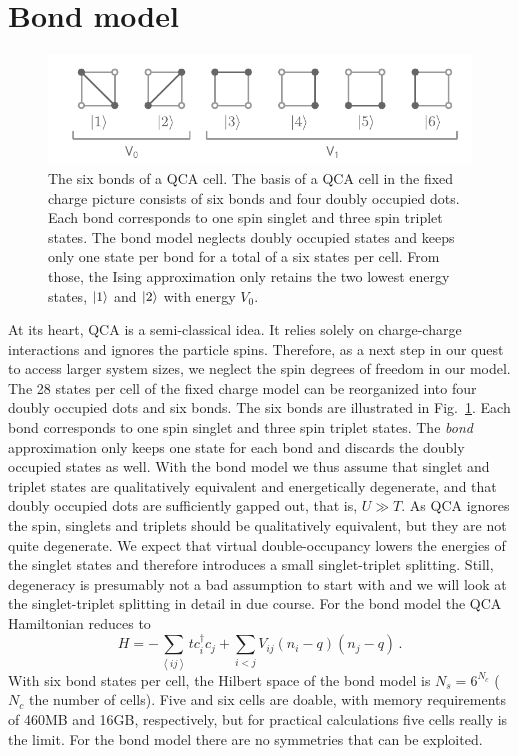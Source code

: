 \section{Bond model}

%
\begin{figure}
  \center
  \includegraphics{bond}
  \caption{
  The six bonds of a QCA cell. The basis of a QCA cell in the fixed charge
  picture consists of six bonds and four doubly occupied dots. Each bond
  corresponds to one spin singlet and three spin triplet states. The bond model
  neglects doubly occupied states and keeps only one state per bond for a total
  of a six states per cell.  From those, the Ising approximation only retains
  the two lowest energy states, $\left|1\right>$ and $\left|2\right>$ with energy $V_0$.
  }
  \label{fig:bond}
\end{figure}
%
At its heart, QCA is a semi-classical idea. It relies solely on charge-charge
interactions and ignores the particle spins. Therefore, as a next step in our
quest to access larger system sizes, we neglect the spin degrees of freedom in
our model. The 28 states per cell of the fixed charge model can be
reorganized into four doubly occupied dots and six bonds. The six bonds are
illustrated in Fig.~\ref{fig:bond}. Each bond corresponds to one spin singlet
and three spin triplet states. The \emph{bond} approximation only keeps one
state for each bond and discards the doubly occupied states as well. With the
bond model we thus assume that singlet and triplet states are
qualitatively equivalent and energetically degenerate, and that doubly occupied
dots are sufficiently gapped out, that is, $U \gg T$. As QCA ignores the spin,
singlets and triplets should be qualitatively equivalent, but they are not quite
degenerate. We expect that virtual double-occupancy lowers the energies of the
singlet states and therefore introduces a small singlet-triplet splitting.
Still, degeneracy is presumably not a bad assumption to start with and we will
look at the singlet-triplet splitting in detail in due course. For the
bond model the QCA Hamiltonian reduces to
%
\begin{equation}
  \label{eq:H_bond}
  H = - \sum_{\left<ij\right>} t c_i^{\dagger} c_j
      + \sum_{i<j} V_{ij} \left( n_i - q \right) \left( n_j - q \right) \, .
\end{equation}
%
With six bond states per cell, the Hilbert space of the bond model is
$N_s = 6^{N_c}$ ($N_c$ the number of cells). Five and six cells are doable, with
memory requirements of 460MB and 16GB, respectively, but for practical
calculations five cells really is the limit. For the bond model there are
no symmetries that can be exploited.


